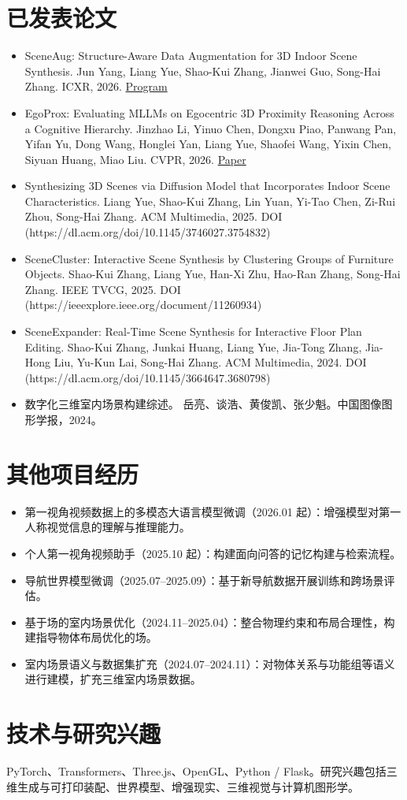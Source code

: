 \documentclass[a4paper,10pt]{ctexart}
\begin{document}
\section*{已发表论文}
\par\smallskip
\begin{itemize}
\item SceneAug: Structure-Aware Data Augmentation for 3D Indoor Scene Synthesis. Jun Yang, Liang Yue, Shao-Kui Zhang, Jianwei Guo, Song-Hai Zhang. ICXR, 2026. \href{https://icxr.net/2026/ProgramPapers.html\#s2}{Program}
\item EgoProx: Evaluating MLLMs on Egocentric 3D Proximity Reasoning Across a Cognitive Hierarchy. Jinzhao Li, Yinuo Chen, Dongxu Piao, Panwang Pan, Yifan Yu, Dong Wang, Honglei Yan, Liang Yue, Shaofei Wang, Yixin Chen, Siyuan Huang, Miao Liu. CVPR, 2026. \href{https://arxiv.org/abs/2605.24456}{Paper}
\item Synthesizing 3D Scenes via Diffusion Model that Incorporates Indoor Scene Characteristics. Liang Yue, Shao-Kui Zhang, Lin Yuan, Yi-Tao Chen, Zi-Rui Zhou, Song-Hai Zhang. ACM Multimedia, 2025. DOI (https://dl.acm.org/doi/10.1145/3746027.3754832)
\item SceneCluster: Interactive Scene Synthesis by Clustering Groups of Furniture Objects. Shao-Kui Zhang, Liang Yue, Han-Xi Zhu, Hao-Ran Zhang, Song-Hai Zhang. IEEE TVCG, 2025. DOI (https://ieeexplore.ieee.org/document/11260934)
\item SceneExpander: Real-Time Scene Synthesis for Interactive Floor Plan Editing. Shao-Kui Zhang, Junkai Huang, Liang Yue, Jia-Tong Zhang, Jia-Hong Liu, Yu-Kun Lai, Song-Hai Zhang. ACM Multimedia, 2024. DOI (https://dl.acm.org/doi/10.1145/3664647.3680798)
\item 数字化三维室内场景构建综述。 岳亮、谈浩、黄俊凯、张少魁。中国图像图形学报，2024。
\end{itemize}
\par\smallskip
\section*{其他项目经历}
\par\smallskip
\begin{itemize}
\item 第一视角视频数据上的多模态大语言模型微调（2026.01 起）：增强模型对第一人称视觉信息的理解与推理能力。
\item 个人第一视角视频助手（2025.10 起）：构建面向问答的记忆构建与检索流程。
\item 导航世界模型微调（2025.07–2025.09）：基于新导航数据开展训练和跨场景评估。
\item 基于场的室内场景优化（2024.11–2025.04）：整合物理约束和布局合理性，构建指导物体布局优化的场。
\item 室内场景语义与数据集扩充（2024.07–2024.11）：对物体关系与功能组等语义进行建模，扩充三维室内场景数据。
\end{itemize}
\par\smallskip
\section*{技术与研究兴趣}
\par\smallskip
PyTorch、Transformers、Three.js、OpenGL、Python / Flask。研究兴趣包括三维生成与可打印装配、世界模型、增强现实、三维视觉与计算机图形学。
\end{document}
